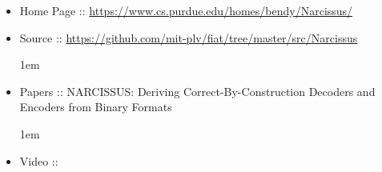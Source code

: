 \documentclass[12pt,twoside]{article}
\begin{document}
\begin{itemize}[noitemsep,topsep=\mdcompacttopsep]%

\item{}Home Page :: \href{https://www.cs.purdue.edu/homes/bendy/Narcissus/}{{\ttfamily https://\hspace{0pt}www.\hspace{0pt}cs.\hspace{0pt}purdue.\hspace{0pt}edu/\hspace{0pt}homes/\hspace{0pt}bendy/\hspace{0pt}Narcissus/\hspace{0pt}}}%

\item{}Source :: \href{https://github.com/mit-plv/fiat/tree/master/src/Narcissus}{{\ttfamily https://\hspace{0pt}github.\hspace{0pt}com/\hspace{0pt}mit-\hspace{0pt}plv/\hspace{0pt}fiat/\hspace{0pt}tree/\hspace{0pt}master/\hspace{0pt}src/\hspace{0pt}Narcissus}}
\begin{mdpre}%
\begin{mdbmarginx}{}{}{}{1em}%
\end{mdbmarginx}%
\end{mdpre}%

\item{}Papers :: NARCISSUS: Deriving Correct-By-Construction Decoders and Encoders from Binary Formats
\begin{mdpre}%
\begin{mdbmarginx}{}{}{}{1em}%
\end{mdbmarginx}%
\end{mdpre}%

\item{}Video :: %
\end{itemize}%
\end{document}
